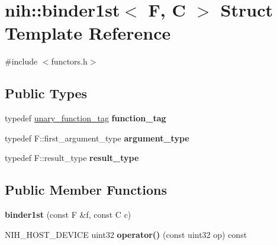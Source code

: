 \hypertarget{structnih_1_1binder1st}{
\section{nih\-:\-:binder1st$<$ \-F, \-C $>$ \-Struct \-Template \-Reference}
\label{structnih_1_1binder1st}
}


{\ttfamily \#include $<$functors.\-h$>$}

\subsection*{\-Public \-Types}
\begin{DoxyCompactItemize}
\item 
\hypertarget{structnih_1_1binder1st_a93a5a9247e724bc625b9d4efbc8ccc39}{
typedef \hyperlink{structnih_1_1unary__function__tag}{unary\-\_\-function\-\_\-tag} {\bfseries function\-\_\-tag}}
\label{structnih_1_1binder1st_a93a5a9247e724bc625b9d4efbc8ccc39}

\item 
\hypertarget{structnih_1_1binder1st_aeee212ba7ba4df3ec9906f5b7d73fa9c}{
typedef \-F\-::first\-\_\-argument\-\_\-type {\bfseries argument\-\_\-type}}
\label{structnih_1_1binder1st_aeee212ba7ba4df3ec9906f5b7d73fa9c}

\item 
\hypertarget{structnih_1_1binder1st_acb907f03d5b115bc6f3e390ab794e205}{
typedef \-F\-::result\-\_\-type {\bfseries result\-\_\-type}}
\label{structnih_1_1binder1st_acb907f03d5b115bc6f3e390ab794e205}

\end{DoxyCompactItemize}
\subsection*{\-Public \-Member \-Functions}
\begin{DoxyCompactItemize}
\item 
\hypertarget{structnih_1_1binder1st_a5c038bb5e7447c9fa1a78436e775e291}{
{\bfseries binder1st} (const \-F \&f, const \-C c)}
\label{structnih_1_1binder1st_a5c038bb5e7447c9fa1a78436e775e291}

\item 
\hypertarget{structnih_1_1binder1st_abae347c460322d8d4b35fc9ee3d5b5b5}{
\-N\-I\-H\-\_\-\-H\-O\-S\-T\-\_\-\-D\-E\-V\-I\-C\-E uint32 {\bfseries operator()} (const uint32 op) const }
\label{structnih_1_1binder1st_abae347c460322d8d4b35fc9ee3d5b5b5}

\end{DoxyCompactItemize}

